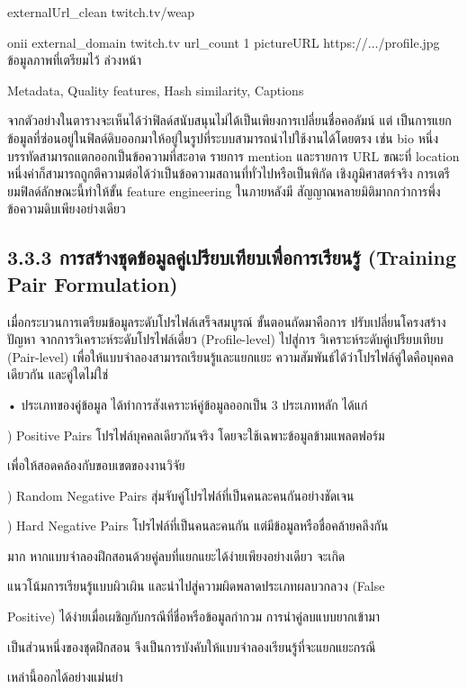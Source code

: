 \documentclass[12pt,a4paper]{report}
\begin{document}
externalUrl\_clean twitch.tv/weap\par
onii external\_domain twitch.tv url\_count 1 pictureURL https://.../profile.jpg ข้อมูลภาพที่เตรียมไว้ ล่วงหน้า\par
Metadata, Quality features, Hash similarity, Captions\par
จากตัวอย่างในตารางจะเห็นได้ว่าฟิลด์สนับสนุนไม่ได้เป็นเพียงการเปลี่ยนชื่อคอลัมน์ แต่ เป็นการแยกข้อมูลที่ซ่อนอยู่ในฟิลด์ดิบออกมาให้อยู่ในรูปที่ระบบสามารถนำไปใช้งานได้โดยตรง เช่น bio หนึ่งบรรทัดสามารถแตกออกเป็นข้อความที่สะอาด รายการ mention และรายการ URL ขณะที่ location หนึ่งค่าก็สามารถถูกตีความต่อได้ว่าเป็นข้อความสถานที่ทั่วไปหรือเป็นพิกัด เชิงภูมิศาสตร์จริง การเตรียมฟิลด์ลักษณะนี้ทำให้ขั้น feature engineering ในภายหลังมี สัญญาณหลายมิติมากกว่าการพึ่งข้อความดิบเพียงอย่างเดียว\par
\subsection*{3.3.3 การสร้างชุดข้อมูลคู่เปรียบเทียบเพื่อการเรียนรู้ (Training Pair Formulation)}
\clearpage
เมื่อกระบวนการเตรียมข้อมูลระดับโปรไฟล์เสร็จสมบูรณ์ ขั้นตอนถัดมาคือการ ปรับเปลี่ยนโครงสร้างปัญหา จากการวิเคราะห์ระดับโปรไฟล์เดี่ยว (Profile-level) ไปสู่การ วิเคราะห์ระดับคู่เปรียบเทียบ (Pair-level) เพื่อให้แบบจำลองสามารถเรียนรู้และแยกแยะ ความสัมพันธ์ได้ว่าโปรไฟล์คู่ใดคือบุคคลเดียวกัน และคู่ใดไม่ใช่\par
\noindent • ประเภทของคู่ข้อมูล ได้ทำการสังเคราะห์คู่ข้อมูลออกเป็น 3 ประเภทหลัก ได้แก่\par
{}) Positive Pairs โปรไฟล์บุคคลเดียวกันจริง โดยจะใช้เฉพาะข้อมูลข้ามแพลตฟอร์ม\par
เพื่อให้สอดคล้องกับขอบเขตของงานวิจัย\par
{}) Random Negative Pairs สุ่มจับคู่โปรไฟล์ที่เป็นคนละคนกันอย่างชัดเจน\par
{}) Hard Negative Pairs โปรไฟล์ที่เป็นคนละคนกัน แต่มีข้อมูลหรือชื่อคล้ายคลึงกัน\par
มาก หากแบบจำลองฝึกสอนด้วยคู่ลบที่แยกแยะได้ง่ายเพียงอย่างเดียว จะเกิด\par
แนวโน้มการเรียนรู้แบบผิวเผิน และนำไปสู่ความผิดพลาดประเภทผลบวกลวง (False\par
Positive) ได้ง่ายเมื่อเผชิญกับกรณีที่ชื่อหรือข้อมูลกำกวม การนำคู่ลบแบบยากเข้ามา\par
เป็นส่วนหนึ่งของชุดฝึกสอน จึงเป็นการบังคับให้แบบจำลองเรียนรู้ที่จะแยกแยะกรณี\par
เหล่านี้ออกได้อย่างแม่นยำ\par
\end{document}
